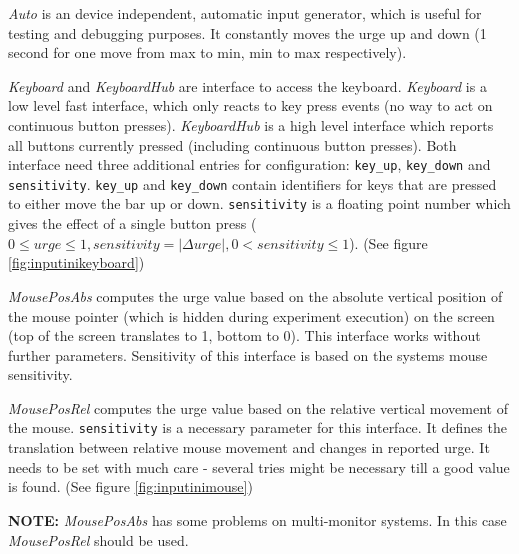 \documentclass[12pt,a4paper]{book}
\begin{document}
\textit{Auto} is an device independent, automatic input generator, which is useful for testing and debugging purposes. It constantly moves the urge up and down (1 second for one move from max to min, min to max respectively).

\textit{Keyboard} and \textit{KeyboardHub} are interface to access the keyboard. \textit{Keyboard} is a low level fast interface, which only reacts to key press events (no way to act on continuous button presses). \textit{KeyboardHub} is a high level interface which reports all buttons currently pressed (including continuous button presses). Both interface need three additional entries for configuration: \verb|key_up|, \verb|key_down| and \verb|sensitivity|. \verb|key_up| and \verb|key_down| contain identifiers for keys that are pressed to either move the bar up or down. \verb|sensitivity| is a floating point number which gives the effect of a single button press ($0 \le urge \le 1, sensitivity = |\Delta urge|, 0 < sensitivity \le 1 $). (See figure \ref{fig:inputinikeyboard})

\textit{MousePosAbs} computes the urge value based on the absolute vertical position of the mouse pointer (which is hidden during experiment execution) on the screen (top of the screen translates to 1, bottom to 0). This interface works without further parameters. Sensitivity of this interface is based on the systems mouse sensitivity. 

\textit{MousePosRel} computes the urge value based on the relative vertical movement of the mouse. \verb|sensitivity| is a necessary parameter for this interface. It defines the translation between relative mouse movement and changes in reported urge. It needs to be set with much care - several tries might be necessary till a good value is found. (See figure \ref{fig:inputinimouse})

\textbf{NOTE:} \textit{MousePosAbs} has some problems on multi-monitor systems. In this case \textit{MousePosRel} should be used.
\end{document}
